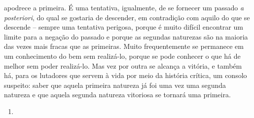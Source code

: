 apodrece a primeira. É uma tentativa, igualmente, de se fornecer um
passado \emph{a posteriori}, do qual se gostaria de descender, em
contradição com aquilo do que se descende -- sempre uma tentativa
perigosa, porque é muito difícil encontrar um limite para a negação do
passado e porque as segundas naturezas são na maioria das vezes mais
fracas que as primeiras. Muito frequentemente se permanece em um
conhecimento do bem sem realizá-lo, porque se pode conhecer o que há de
melhor sem poder realizá-lo. Mas vez por outra se alcança a vitória, e
também há, para os lutadores que servem à vida por meio da história
crítica, um consolo suspeito: saber que aquela primeira natureza já foi
uma vez uma segunda natureza e que aquela segunda natureza vitoriosa se
tornará uma primeira.

\begin{enumerate}
\item
\end{enumerate}

